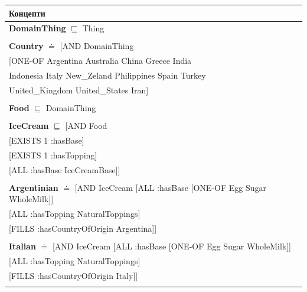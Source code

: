 \documentclass[12pt]{article}
\newcommand*{\MyIndent}{\hspace*{7em}}
\begin{document}
        \begin{tabularx}{1\textwidth}{@{}X@{}}
        \toprule
        \textbf{Концепти} \\
        \midrule
        \endhead

            \textbf{DomainThing} $\sqsubseteq$ Thing \\ \tabularnewline
        
            \textbf{Country} $\doteq$ [AND DomainThing \\
                            \MyIndent [ONE-OF Argentina Australia China Greece India \\
                                    \MyIndent Indonesia Italy New\_Zeland Philippines Spain Turkey \\
                                    \MyIndent United\_Kingdom United\_States Iran] \\
                            \tabularnewline

            \textbf{Food} $\sqsubseteq$ DomainThing \\ \tabularnewline


            
            \textbf{IceCream} $\sqsubseteq$ [AND Food \\
                                      \MyIndent [EXISTS 1 :hasBase] \\
                                      \MyIndent [EXISTS 1 :hasTopping] \\
                                      \MyIndent [ALL :hasBase IceCreamBase]] \\
                                      \tabularnewline
           
            \textbf{Argentinian} $\doteq$ [AND IceCream [ALL :hasBase [ONE-OF Egg Sugar WholeMilk]] \\
                                              \MyIndent [ALL :hasTopping NaturalToppings] \\
                                              \MyIndent [FILLS :hasCountryOfOrigin Argentina]] \\
                                              \tabularnewline
           
            \textbf{Italian} $\doteq$ [AND IceCream [ALL :hasBase [ONE-OF Egg Sugar WholeMilk]] \\
                                          \MyIndent [ALL :hasTopping NaturalToppings] \\
                                          \MyIndent [FILLS :hasCountryOfOrigin Italy]] \\
                                          \tabularnewline
            

\end{tabularx}
\end{document}
